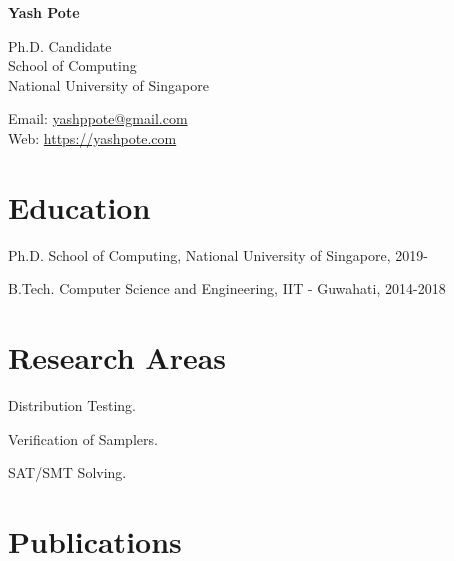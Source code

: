 \documentclass[12pt,letterpaper]{report}
\newcommand{\myname}{Yash Pote}
\newcommand{\namefont}[1]{{\normalfont\bfseries\Huge{#1}}}
\newcommand{\listitemspace}{0.15em}
\renewenvironment{itemize}
{\begin{list}{}{\setlength{\leftmargin}{0em}
			\setlength{\parskip}{0em}
			\setlength{\itemsep}{\listitemspace}
			\setlength{\parsep}{\listitemspace}}}
	{\end{list}}
\begin{document}
	\raggedright
	
	\namefont{\myname}
	
	\vspace{1em}
	\begin{minipage}[t]{0.68\textwidth}
		Ph.D. Candidate \\
		School of Computing \\
		National University of Singapore
	\end{minipage}
	\begin{minipage}[t]{0.31\textwidth}
		Email: \href{mailto:yashppote@gmail.com}{yashppote@gmail.com} \\
		Web: \href{https://yashpote.com}{https://yashpote.com}
	\end{minipage}
	\vspace{0.5em}
	
	
	
	\section*{Education}
	
	\begin{tablist}
		
		\item[Ph.D.] \tab School of Computing, National University of Singapore, 2019-
		
		\item[B.Tech.]  \tab Computer Science and Engineering, IIT - Guwahati, 2014-2018
	\end{tablist}
	
	
	\section*{Research Areas}
	
	\begin{itemize}
		
		\item Distribution Testing.
		\item Verification of Samplers.
		\item SAT/SMT Solving. 
		
	\end{itemize}
	
	
	
	\section*{Publications}
	
\end{document}
